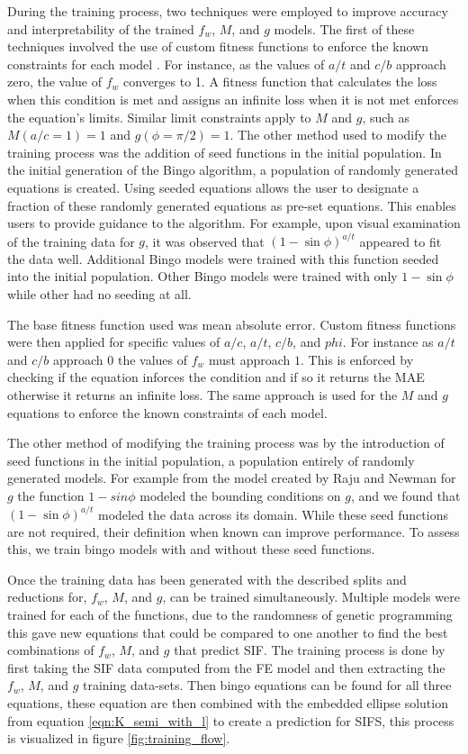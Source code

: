 During the training process, two techniques were employed to improve accuracy and interpretability of the trained $f_w$, $M$, and $g$ models. The first of these techniques involved the use of custom fitness functions to enforce the known constraints  for each model \cite{Hongsup, Karl, Randall2022}. For instance, as the values of $a/t$ and $c/b$ approach zero, the value of $f_w$ converges to 1. A fitness function that calculates the loss when this condition is met and assigns an infinite loss when it is not met enforces the equation's limits. Similar limit constraints apply to $M$ and $g$, such as $M(a/c = 1) = 1$ and $g(\phi = \pi/2) = 1$. The other method used to modify the training process was the addition of seed functions in the initial population. In the initial generation of the Bingo algorithm, a population of randomly generated equations is created. Using seeded equations allows the user to designate a fraction of these randomly generated equations as pre-set equations. This enables users to provide guidance to the algorithm. For example, upon visual examination of the training data for $g$, it was observed that $\left(1 - \sin\phi\right)^{a/t}$ appeared to fit the data well. Additional Bingo models were trained with this function seeded into the initial population. Other Bingo models were trained with only $1 - \sin\phi$ while other had no seeding at all. 

The base fitness function used was mean absolute error. Custom fitness functions were then applied for specific values of $a/c$, $a/t$, $c/b$, and $phi$. For instance as $a/t$ and $c/b$ approach $0$ the values of $f_w$ must approach $1$. This is enforced by checking if the equation inforces the condition and if so it returns the MAE otherwise it returns an infinite loss. The same approach is used for the $M$ and $g$ equations to enforce the known constraints of each model.

The other method of modifying the training process was by the introduction of seed functions \cite{donovan} in the initial population, a population entirely of randomly generated models. For example from the model created by Raju and Newman for $g$ the function  $1-sin\phi$ modeled the bounding conditions on $g$, and we found that $\left(1 - \sin\phi\right)^{a/t}$ modeled the data across its domain. While these seed functions are not required, their definition when known can improve performance. To assess this, we train bingo models with and without these seed functions.

Once the training data has been generated with the described splits and reductions for, $f_w$, $M$, and $g$, can be trained simultaneously. Multiple models were trained for each of the functions, due to the randomness of genetic programming this gave new equations that could be compared to one another to find the best combinations of $f_w$, $M$, and $g$ that predict SIF. The training process is done by first taking the SIF data computed from the FE model and then extracting the $f_w$, $M$, and $g$ training data-sets. Then bingo equations can be found for all three equations, these equation are then combined with the embedded ellipse solution from equation \ref{eqn:K_semi_with_l} to create a prediction for SIFS, this process is visualized in figure \ref{fig:training_flow}.

